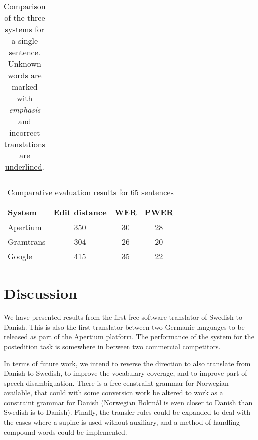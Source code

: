 \documentclass[11pt]{article}
\begin{document}
\begin{table*}
\begin{tabular}{|c|l|l|}


\end{tabular}
 \caption{Comparison of the three systems for a single sentence. Unknown words are marked with \emph{emphasis} and
     incorrect translations are \underline{underlined}.}
 \label{table:extranslations}
\end{table*}

\begin{table}
\centering
\begin{tabular}{|l|c|c|c|}
\hline
System & Edit distance & WER & PWER\\
\hline
Apertium  & 350   & 30    & 28 \\
Gramtrans & 304   & 26    & 20 \\
Google    & 415   & 35    & 22 \\
\hline
\end{tabular}
    \caption{Comparative evaluation results for 65 sentences}
    \label{table:compeval}
\end{table}

\section{Discussion}

We have presented results from the first free-software translator of Swedish to Danish. This
is also the first translator between two Germanic languages to be released as part of the 
Apertium platform. The performance of the system for the postedition task is somewhere in between 
two commercial competitors. 

In terms of future work, we intend to reverse the direction to also translate from Danish to 
Swedish, to improve the vocabulary coverage, and to improve part-of-speech disambiguation. There
is a free constraint grammar for Norwegian \citep{hagen2000cbt} available, that could with some
conversion work be altered to work as a constraint grammar for Danish (Norwegian Bokmål is even
closer to Danish than Swedish is to Danish). Finally, the transfer rules could be expanded to 
deal with the cases where a supine is used without auxiliary, and a method of handling compound
words could be implemented.
\end{document}
